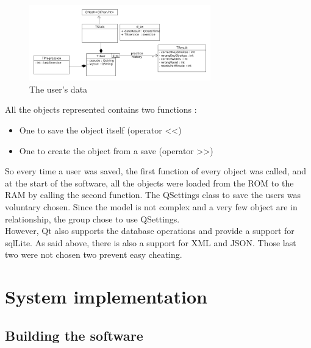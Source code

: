 \begin{figure}[H]
	\centering
	\includegraphics[width=0.7\textwidth]{images/diagram-data.png}
	 \caption{The user's data}
	 \label{diagram-data}
\end{figure}

All the objects represented contains two functions :
\begin{itemize}
	\item One to save the object itself (operator <<)
	\item One to create the object from a save (operator >>)
\end{itemize}

So every time a user was saved, the first function of every object was called, and at the start of the software, all the objects were loaded from the ROM to the RAM by calling the second function. The QSettings class to save the users was voluntary chosen. Since the model is not complex and a very few object are in relationship, the group chose to use QSettings. \\
However, Qt also supports the database operations and provide a support for sqlLite. As said above, there is also a support for XML and JSON. Those last two were not chosen two prevent easy cheating.


\part{System implementation}

\chapter{Building the software}
